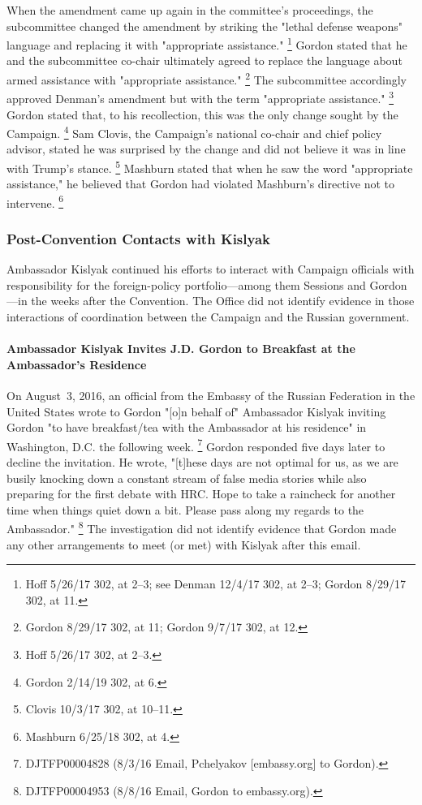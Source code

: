 When the amendment came up again in the committee's proceedings, the subcommittee changed the amendment by striking the "lethal defense weapons" language and replacing it with "appropriate assistance."%
\footnote{Hoff 5/26/17 302, at 2--3;
see Denman 12/4/17 302, at 2--3;
Gordon 8/29/17 302, at 11.}
Gordon stated that he and the subcommittee co-chair ultimately agreed to replace the language about armed assistance with "appropriate assistance."%
\footnote{Gordon 8/29/17 302, at 11;
Gordon 9/7/17 302, at 12.}
The subcommittee accordingly approved Denman's amendment but with the term "appropriate assistance."%
\footnote{Hoff 5/26/17 302, at 2--3.}
Gordon stated that, to his recollection, this was the only change sought by the Campaign.%
\footnote{Gordon 2/14/19 302, at 6.}
Sam Clovis, the Campaign's national co-chair and chief policy advisor, stated he was surprised by the change and did not believe it was in line with Trump's stance.%
\footnote{Clovis 10/3/17 302, at 10--11.}
Mashburn stated that when he saw the word "appropriate assistance," he believed that Gordon had violated Mashburn's directive not to intervene.%
\footnote{Mashburn 6/25/18 302, at 4.}

\subsubsection{Post-Convention Contacts with Kislyak}

Ambassador Kislyak continued his efforts to interact with Campaign officials with responsibility for the foreign-policy portfolio---among them Sessions and Gordon---in the weeks after the Convention.
The Office did not identify evidence in those interactions of coordination between the Campaign and the Russian government.

\paragraph{Ambassador Kislyak Invites J.D. Gordon to Breakfast at the Ambassador's Residence}

On August~3, 2016, an official from the Embassy of the Russian Federation in the United States wrote to Gordon "[o]n behalf of" Ambassador Kislyak inviting Gordon "to have breakfast/tea with the Ambassador at his residence" in Washington, D.C. the following week.%
\footnote{DJTFP00004828 (8/3/16 Email, Pchelyakov [embassy\@russianembassy.org] to Gordon).}
Gordon responded five days later to decline the invitation.
He wrote, "[t]hese days are not optimal for us, as we are busily knocking down a constant stream of false media stories while also preparing for the first debate with HRC\null.
Hope to take a raincheck for another time when things quiet down a bit.
Please pass along my regards to the Ambassador."%
\footnote{DJTFP00004953 (8/8/16 Email, Gordon to embassy\@russianembassy.org).}
The investigation did not identify evidence that Gordon made any other arrangements to meet (or met) with Kislyak after this email.

